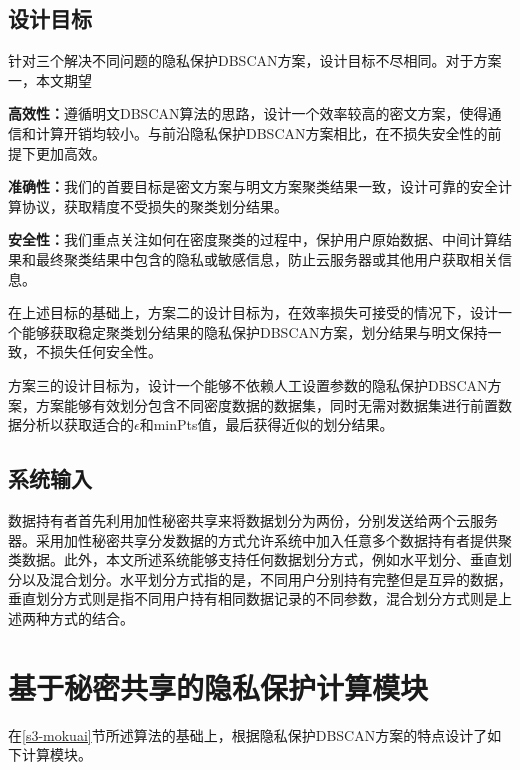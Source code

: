 \subsection{设计目标}
针对三个解决不同问题的隐私保护DBSCAN方案，设计目标不尽相同。对于方案一，本文期望
\begin{compactitem}
	\item\textbf{高效性：}遵循明文DBSCAN算法的思路，设计一个效率较高的密文方案，使得通信和计算开销均较小。与前沿隐私保护DBSCAN方案相比，在不损失安全性的前提下更加高效。
	\item\textbf{准确性：}我们的首要目标是密文方案与明文方案聚类结果一致，设计可靠的安全计算协议，获取精度不受损失的聚类划分结果。
	\item\textbf{安全性：}我们重点关注如何在密度聚类的过程中，保护用户原始数据、中间计算结果和最终聚类结果中包含的隐私或敏感信息，防止云服务器或其他用户获取相关信息。
\end{compactitem}

在上述目标的基础上，方案二的设计目标为，在效率损失可接受的情况下，设计一个能够获取稳定聚类划分结果的隐私保护DBSCAN方案，划分结果与明文保持一致，不损失任何安全性。

方案三的设计目标为，设计一个能够不依赖人工设置参数的隐私保护DBSCAN方案，方案能够有效划分包含不同密度数据的数据集，同时无需对数据集进行前置数据分析以获取适合的$\epsilon$和minPts值，最后获得近似的划分结果。

\subsection{系统输入}
数据持有者首先利用加性秘密共享来将数据划分为两份，分别发送给两个云服务器。采用加性秘密共享分发数据的方式允许系统中加入任意多个数据持有者提供聚类数据。此外，本文所述系统能够支持任何数据划分方式，例如水平划分、垂直划分以及混合划分。水平划分方式指的是，不同用户分别持有完整但是互异的数据\cite{gheid2016efficient}，垂直划分方式则是指不同用户持有相同数据记录的不同参数\cite{doganay2008distributed}，混合划分方式则是上述两种方式的结合\cite{yu2010multi}。
\section{基于秘密共享的隐私保护计算模块}
\label{s4-subpro}
在\ref{s3-mokuai}节所述算法的基础上，根据隐私保护DBSCAN方案的特点设计了如下计算模块。
